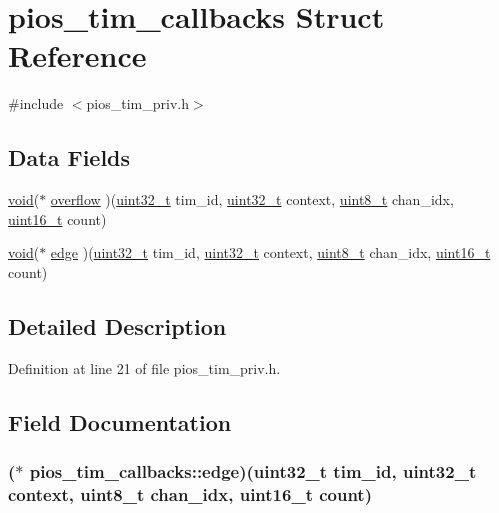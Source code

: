 \hypertarget{structpios__tim__callbacks}{\section{pios\-\_\-tim\-\_\-callbacks Struct Reference}
\label{structpios__tim__callbacks}
}


{\ttfamily \#include $<$pios\-\_\-tim\-\_\-priv.\-h$>$}

\subsection*{Data Fields}
\begin{DoxyCompactItemize}
\item 
\hyperlink{group___n_a_m_e_ga18028b8badbf1ea7e704ccac3c488e82}{void}($\ast$ \hyperlink{structpios__tim__callbacks_a7e55f8bf5b5867b790dc9bf1e929ac6f}{overflow} )(\hyperlink{stdint_8h_a435d1572bf3f880d55459d9805097f62}{uint32\-\_\-t} tim\-\_\-id, \hyperlink{stdint_8h_a435d1572bf3f880d55459d9805097f62}{uint32\-\_\-t} context, \hyperlink{stdint_8h_aba7bc1797add20fe3efdf37ced1182c5}{uint8\-\_\-t} chan\-\_\-idx, \hyperlink{stdint_8h_a273cf69d639a59973b6019625df33e30}{uint16\-\_\-t} count)
\item 
\hyperlink{group___n_a_m_e_ga18028b8badbf1ea7e704ccac3c488e82}{void}($\ast$ \hyperlink{structpios__tim__callbacks_aba0c27c4d43db18366fe06221c7ccb87}{edge} )(\hyperlink{stdint_8h_a435d1572bf3f880d55459d9805097f62}{uint32\-\_\-t} tim\-\_\-id, \hyperlink{stdint_8h_a435d1572bf3f880d55459d9805097f62}{uint32\-\_\-t} context, \hyperlink{stdint_8h_aba7bc1797add20fe3efdf37ced1182c5}{uint8\-\_\-t} chan\-\_\-idx, \hyperlink{stdint_8h_a273cf69d639a59973b6019625df33e30}{uint16\-\_\-t} count)
\end{DoxyCompactItemize}


\subsection{Detailed Description}


Definition at line 21 of file pios\-\_\-tim\-\_\-priv.\-h.



\subsection{Field Documentation}
\hypertarget{structpios__tim__callbacks_aba0c27c4d43db18366fe06221c7ccb87}{
\subsubsection[{edge}]{($\ast$ pios\-\_\-tim\-\_\-callbacks\-::edge)({\bf uint32\-\_\-t} tim\-\_\-id, {\bf uint32\-\_\-t} context, {\bf uint8\-\_\-t} chan\-\_\-idx, {\bf uint16\-\_\-t} count)}}\label{structpios__tim__callbacks_aba0c27c4d43db18366fe06221c7ccb87}


